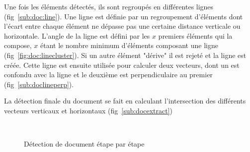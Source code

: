 Une fois les éléments détectés, ils sont regroupés en différentes lignes (fig~\ref{sub:doc:line}).
Une ligne est définie par un regroupement d'éléments dont l'écart entre chaque élément ne dépasse pas une certaine distance verticale ou horizontale. L'angle de la ligne est défini par les $x$ premiers éléments qui la compose, $x$ étant le nombre minimum d'éléments composant une ligne (fig~\ref{fig:doc:linecluster}). Si un autre élément "dérive" il est rejeté et la ligne est créée. Cette ligne est ensuite utilisée pour calculer deux vecteurs, dont un est confondu avec la ligne et le deuxième est perpendiculaire au premier (fig~\ref{sub:doclineperp}).

La détection finale du document se fait en calculant l'intersection des différents vecteurs verticaux et horizontaux (fig~\ref{sub:docextract})

\begin{figure}[H]
    \centering
      \\
\caption{Détection de document étape par étape}
\label{fig:docdetection}
\end{figure}
	
